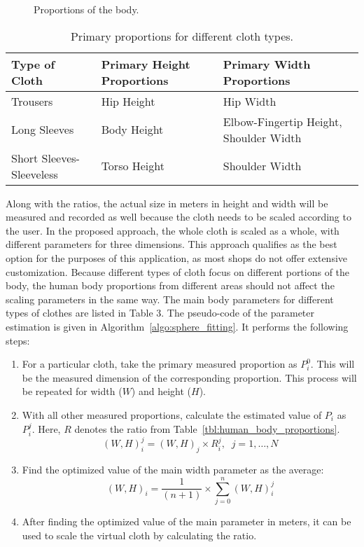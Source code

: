 \begin{figure}[ht]
\centerline{}
\caption{Proportions of the body.}
\label{fig:body_proportions}
\end{figure}

\begin{table}
\center
\begin{tabular}{ | p{3cm} | p{3.5cm} | p{3.5cm}  |}
\hline
\textbf{Type of Cloth} & \textbf{Primary Height Proportions} & \textbf{Primary Width Proportions}  \\ \hline
Trousers & Hip Height & Hip Width \\ \hline
Long Sleeves & Body Height & Elbow-Fingertip Height, Shoulder Width \\ \hline
Short Sleeves-Sleeveless & Torso Height & Shoulder Width \\ 
\hline
\end{tabular}
\caption{Primary proportions for different cloth types.}
\label{tbl:primary_proportions}
\end{table}

Along with the ratios, the actual size in meters in height and width will be measured and recorded as well because the cloth needs to be scaled according to the user. In the proposed approach, the whole cloth is scaled as a whole, with different parameters for three dimensions. This approach qualifies as the best option for the purposes of this application, as most shops do not offer extensive customization. Because different types of cloth focus on different portions of the body, the human body proportions from different areas should not affect the scaling parameters in the same way. The main body parameters for different types of clothes are listed in Table 3. The pseudo-code of the parameter estimation is given in Algorithm~\ref{algo:sphere_fitting}. It performs the following steps:

\begin{enumerate}
\item For a particular cloth, take the primary measured proportion as $P_i^0$. This will be the measured dimension of the corresponding proportion. This process will be repeated for width ($W$) and height ($H$).
\item With all other measured proportions, calculate the estimated value of $P_i$ as $P_i^j$. Here, $R$ denotes the ratio from Table~\ref{tbl:human_body_proportions}.
\begin{equation}
(W,H)_i^j=(W,H)_j \times R_i^j, \;\; j=1, \ldots, N
\label{eqn:proportion_estimation}
\end{equation}
\item Find the optimized value of the main width parameter as the average:
\begin{equation}
(W,H)_i=\frac{1}{(n+1)} \times \sum\limits_{j=0}^n (W,H)_i^j
\label{eqn:optimized_parameter}
\end{equation}
\item After finding the optimized value of the main parameter in meters, it can be used to scale the virtual cloth by calculating the ratio.
\end{enumerate}



